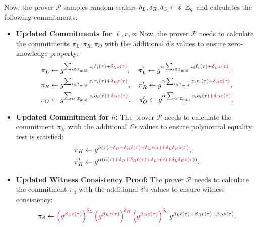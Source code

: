 \documentclass[../../book.tex]{subfiles}
\begin{document}
\begin{proposition}
    Now, the prover $\mathcal{P}$ samples random scalars $\delta_L, \delta_R, \delta_O \leftarrowS \mathbb{Z}_q$ and calculates the following commitments:
    \begin{itemize}
        \item \textbf{Updated Commitments for $\ell,r,o$:} Now, the prover $\mathcal{P}$ needs to calculate the commitments $\pi_L,\pi_R,\pi_O$ with the additional $\delta$'s values to ensure zero-knowledge property:
        \begin{align*}
            \pi_L &\gets g^{\sum_{i \in \mathcal{I}_{\text{mid}}}z_i\ell_i(\tau) + \textcolor{purple}{\delta_Lz(\tau)}}, \quad \pi_L' \gets g^{\alpha\sum_{i \in \mathcal{I}_{\text{mid}}}z_i\ell_i(\tau) + \textcolor{purple}{\delta_Lz(\tau)}}, \\
            \pi_R &\gets g^{\sum_{i \in \mathcal{I}_{\text{mid}}}z_ir_i(\tau) + \textcolor{purple}{\delta_Rz(\tau)}}, \quad \pi_R' \gets g^{\alpha\sum_{i \in \mathcal{I}_{\text{mid}}}z_ir_i(\tau) + \textcolor{purple}{\delta_Rz(\tau)}}, \\
            \pi_O &\gets g^{\sum_{i \in \mathcal{I}_{\text{mid}}}z_io_i(\tau) + \textcolor{purple}{\delta_Oz(\tau)}}, \quad \pi_O' \gets g^{\alpha\sum_{i \in \mathcal{I}_{\text{mid}}}z_io_i(\tau) + \textcolor{purple}{\delta_Oz(\tau)}}.
        \end{align*}
        \item \textbf{Updated Commitment for $h$:} The prover $\mathcal{P}$ needs to calculate the commitment $\pi_H$ with the additional $\delta$'s values to ensure polynomial equality test is satisfied:
        \begin{equation*}
            \begin{aligned}
                &\pi_H \gets g^{h(\tau) + \textcolor{purple}{\delta_O + \delta_R \ell(\tau) + \delta_L r(\tau) + \delta_L \delta_R z(\tau)}}, \\ 
                &\pi_H' \gets g^{\alpha(h(\tau) + \textcolor{purple}{\delta_O + \delta_R \ell(\tau) + \delta_L r(\tau) + \delta_L \delta_R z(\tau)})}.                
            \end{aligned}
        \end{equation*}
        \item \textbf{Updated Witness Consistency Proof:} The prover $\mathcal{P}$ needs to calculate the commitment $\pi_{\beta}$ with the additional $\delta$'s values to ensure witness consistency:
        \begin{equation*}
            \pi_{\beta} \gets \textcolor{purple}{\left(g^{\beta_L z(\tau)}\right)^{\delta_L}\left(g^{\beta_R z(\tau)}\right)^{\delta_R}\left(g^{\beta_O z(\tau)}\right)^{\delta_O}}g^{\beta_L\ell(\tau) + \beta_Rr(\tau) + \beta_Oo(\tau)}.
        \end{equation*}
    \end{itemize}
\end{proposition}
\end{document}
